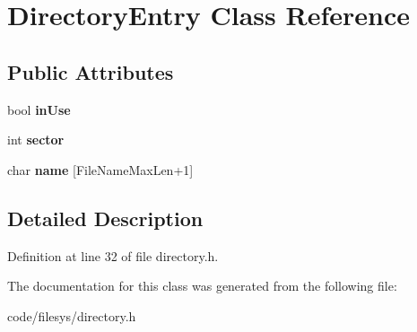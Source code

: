 \section{Directory\+Entry Class Reference}
\label{class_directory_entry}
\subsection*{Public Attributes}
\begin{DoxyCompactItemize}
\item 
bool {\bfseries in\+Use}\label{class_directory_entry_a0686edcff271cdb66a2cb19696e7200a}

\item 
int {\bfseries sector}\label{class_directory_entry_afe912144a818d7884e3f22c842cac3c5}

\item 
char {\bfseries name} [File\+Name\+Max\+Len+1]\label{class_directory_entry_aee1f8d0797adfa14488f4e4516118664}

\end{DoxyCompactItemize}


\subsection{Detailed Description}


Definition at line 32 of file directory.\+h.



The documentation for this class was generated from the following file\+:\begin{DoxyCompactItemize}
\item 
code/filesys/directory.\+h\end{DoxyCompactItemize}
